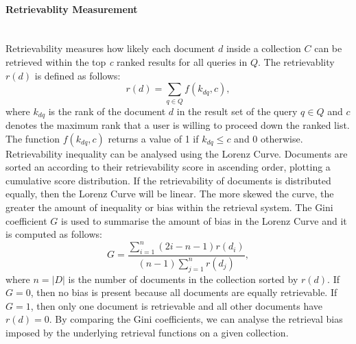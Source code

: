 \paragraph{Retrievablity Measurement}
\ \\
Retrievability measures how likely each document $ d $ inside a collection $ C $ can be retrieved within the top \textit{c} ranked results for all queries in $ Q $. The retrievablity $ r(d) $ is defined as follows:
\[
r(d)=\sum_{q \in Q}f(k_{dq},c),
\]
where $ k_{dq} $ is the rank of the document $ d $ in the result set of the query $ q \in Q $ and $ c $ denotes the maximum rank that a user is willing to proceed down the ranked list. The function $ f(k_{dq},c) $ returns a value of 1 if $ k_{dq} \leq c $ and 0 otherwise. Retrievability inequality can be analysed using the Lorenz Curve. Documents are sorted an according to their retrievability score in ascending order, plotting a cumulative score distribution. If the retrievability of documents is distributed equally, then the Lorenz Curve will be linear. The more skewed the curve, the greater the amount of inequality or bias within the retrieval system. The Gini coefficient $ G $ is used to summarise the amount of bias in the Lorenz Curve and it is computed as follows:
\begin{equation}
G=\frac{\sum_{i=1}^n(2i-n-1)r(d_{i})}{(n-1)\sum_{j=1}^nr(d_{j})},
\end{equation}
\noindent
where $ n=|D| $ is the number of documents in the collection sorted by $ r(d) $. If $ G=0 $, then no bias is present because all documents are equally retrievable. If $ G=1 $, then only one document is retrievable and all other documents have $ r(d)=0 $. By comparing the Gini coefficients, we can analyse the retrieval bias imposed by the underlying retrieval functions on a given collection.

